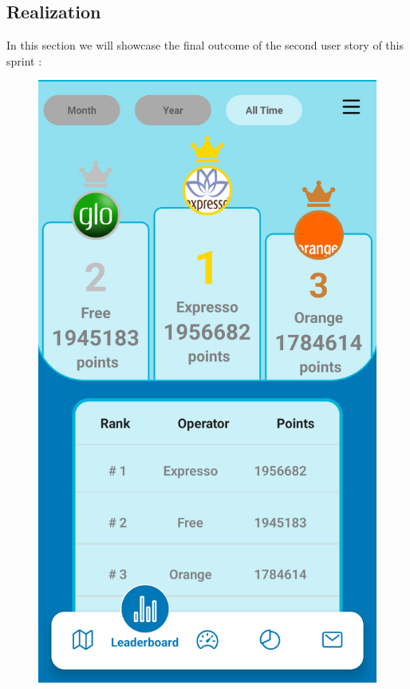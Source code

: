 \subsection{Realization}
In this section we will showcase the final outcome of the second user story of this sprint :
\begin{figure}[H]
\begin{minipage}{0.3\textwidth}
    \centering
    \includegraphics[width=\linewidth]{images/sprint3/leaderBoardModule (3).png}

\end{minipage}
\end{figure}
